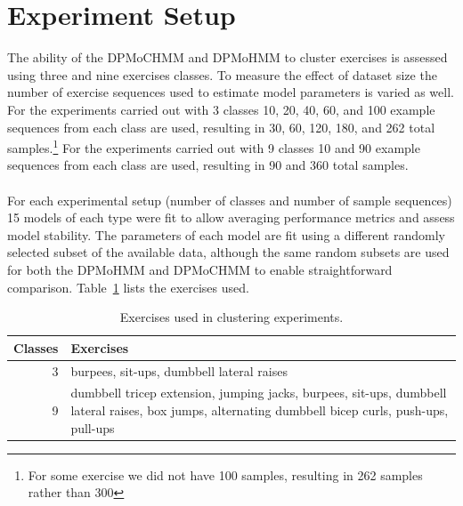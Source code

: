 \documentclass[12pt]{report}
\newcommand{\1}[0]{\mathbbm{1}}
\begin{document}
\section{Experiment Setup}
The ability of the \ac{DPMoCHMM} and \ac{DPMoHMM} to cluster exercises is assessed
using three and nine exercises classes. To measure the effect of dataset size the number of
exercise sequences used to estimate model parameters is varied as well. For the experiments
carried out with 3 classes 10, 20, 40, 60, and 100 example sequences from each class are used,
resulting in 30, 60, 120, 180, and 262 total samples.\footnote{For some exercise we did not
have 100 samples, resulting in 262 samples rather than 300} For the experiments carried out with
9 classes 10 and 90 example sequences from each class are used, resulting in 90 and 360 total samples.
\\\\
For each experimental setup (number of classes and number of sample sequences)
15 models of each type were fit to allow averaging performance metrics and assess model stability.
The parameters of each model are fit using a different randomly selected subset of the available data,
although the same random subsets are used for both the \ac{DPMoHMM} and \ac{DPMoCHMM} to enable
straightforward comparison. Table~\ref{table:cluster-experiment} lists the exercises used.

\begin{table}[H]
    \centering
    \begin{tabular}{r | p{8cm}}\hline
    \textbf{Classes} & \textbf{Exercises} \\\hline
    3 &  burpees, sit-ups, dumbbell lateral raises\\\hline
    9 & dumbbell tricep extension, jumping jacks, burpees, sit-ups, dumbbell lateral raises, box jumps, alternating dumbbell bicep curls, push-ups, pull-ups\\
    \end{tabular}
    \caption[Exercises used in clustering experiments]{
        Exercises used in clustering experiments.
    }
    \label{table:cluster-experiment}
\end{table}
\end{document}
